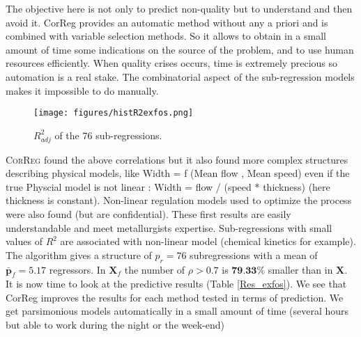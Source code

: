 \documentclass[12pt,a4paper]{report}
\begin{document}
	The objective here is not only to predict non-quality but to understand and then avoid it. CorReg provides an automatic method without any a priori and is combined with variable selection methods. So it allows to obtain in a small amount of time some indications on the source of the problem, and to use human resources efficiently. When quality crises occurs, time is extremely precious so automation is a real stake. The combinatorial aspect of the sub-regression models makes it impossible to do manually.
		
		
		\begin{figure}[h!]
		\centering
			\texttt{[image: figures/histR2exfos.png]} 
			\caption{$R^2_{adj}$ of the 76 sub-regressions.}
\end{figure} 
		
		
	\textsc{CorReg} found the above correlations but it also found more complex structures describing physical models, like   Width = f (Mean flow , Mean speed) even if the true Physcial model is not linear : Width = flow / (speed * thickness) (here thickness is constant). Non-linear regulation models used to optimize the process were also found (but are confidential). These first results are easily understandable and meet metallurgists expertise.  Sub-regressions with small values of $R^2$ are associated with non-linear model (chemical kinetics for example).
			The algorithm gives a structure of $p_r=76$ subregressions with a mean of $\bar{\boldsymbol{p}}_f=5.17$ regressors. In $\boldsymbol{X}_f$ the number of $\rho>0.7$ is $\textbf{79.33\%}$ smaller than in $\boldsymbol{X}$.		
	\\
	
	
			It is now time to look at the predictive results (Table \ref{Res_exfos}). We see that CorReg improves the results for each method tested in terms of prediction.
			We get parsimonious models automatically in a small amount of time (several hours but able to work during the night or the week-end)
\end{document}
